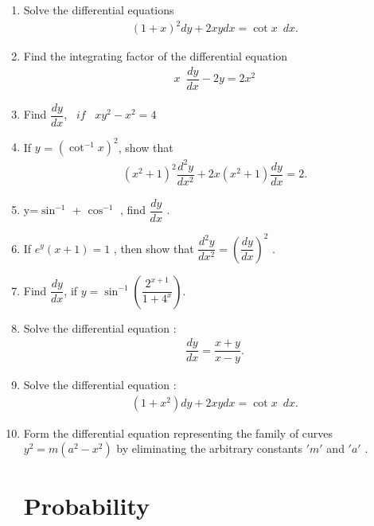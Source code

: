 \documentclass[12pt,-letter paper]{article}
\providecommand{\brak}[1]{\ensuremath{\left(#1\right)}}
\begin{document}
\begin{enumerate}
\item Solve the differential equations
\begin{align*}
    \brak{1+x}^2dy+2xy dx =\cot{x} \hspace{6pt} dx.
\end{align*} 

\item Find the integrating factor of the differential equation 
\begin{align*}
x \hspace{6pt} \dfrac{dy}{dx}-2y  = 2x^{2}
\end{align*}

\item Find $\dfrac{dy}{dx}$,  $\hspace{6pt}  if  \hspace{6pt} $    $xy^{2}-x^{2} = 4$

\item If $y$ = $\brak{\cot^{-1} x}^{2}$, show that
\begin{align*}
\brak{x^2+1}^2 \dfrac{d^2y}{dx^2}+2x\brak{x^{2}+1}\dfrac{dy}{dx}=2.
\end{align*} 

\item y=$\sin^{-1}$ + $\cos^{-1}$ , find $\dfrac{dy}{dx}$ .

\item If $e^{y}\brak{x+1}=1$ , then show that $\dfrac{d^{2}y}{dx^{2}} =\brak{ \dfrac{dy}{dx}}^{2}$ .

\item Find $\dfrac{dy}{dx}$, if $y = \sin ^{-1}\brak{\dfrac{2^{x+1}}{1+4^{x}}}$.

\item Solve the differential equation :
\begin{align*}
    \dfrac{dy}{dx} = \dfrac{x+y}{x-y}.
\end{align*}

\item Solve the differential equation :
\begin{align*}
    \brak{1+x^{2}}dy + 2xy dx =\cot x\hspace{6pt} dx.
\end{align*}

\item Form the differential equation representing the family of curves $y^2=m\brak{a^2-x^2}$ by eliminating the arbitrary constants $'m'$ and $'a'$ .

\section{Probability}


\end{enumerate}
\end{document}
